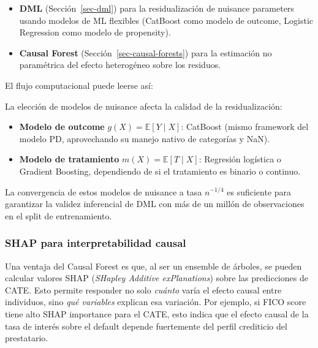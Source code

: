 \documentclass[
  spanish,
  11pt,
  letterpaper,
]{scrbook}
\providecommand{\tightlist}{%
  \setlength{\itemsep}{0pt}\setlength{\parskip}{0pt}}
\theoremstyle{plain}
\theoremstyle{remark}
\begin{document}
\begin{itemize}
\tightlist
\item
  \textbf{DML} (Sección~\ref{sec-dml}) para la residualización de
  nuisance parameters usando modelos de ML flexibles (CatBoost como
  modelo de outcome, Logistic Regression como modelo de propensity).
\item
  \textbf{Causal Forest} (Sección~\ref{sec-causal-forests}) para la
  estimación no paramétrica del efecto heterogéneo sobre los residuos.
\end{itemize}

El flujo computacional puede leerse así:

\begin{tcolorbox}[enhanced jigsaw, arc=.35mm, bottomrule=.15mm, bottomtitle=1mm, breakable, colback=white, colbacktitle=quarto-callout-note-color!10!white, colframe=quarto-callout-note-color-frame, coltitle=black, left=2mm, leftrule=.75mm, opacityback=0, opacitybacktitle=0.6, rightrule=.15mm, title=\textcolor{quarto-callout-note-color}{\faInfo}\hspace{0.5em}{Modelos de nuisance en este proyecto}, titlerule=0mm, toprule=.15mm, toptitle=1mm]

La elección de modelos de nuisance afecta la calidad de la
residualización:

\begin{itemize}
\tightlist
\item
  \textbf{Modelo de outcome} \(g(X) = \mathbb{E}[Y \mid X]\): CatBoost
  (mismo framework del modelo PD, aprovechando su manejo nativo de
  categorías y NaN).
\item
  \textbf{Modelo de tratamiento} \(m(X) = \mathbb{E}[T \mid X]\):
  Regresión logística o Gradient Boosting, dependiendo de si el
  tratamiento es binario o continuo.
\end{itemize}

La convergencia de estos modelos de nuisance a tasa \(n^{-1/4}\) es
suficiente para garantizar la validez inferencial de DML con más de un
millón de observaciones en el split de entrenamiento.

\end{tcolorbox}

\subsubsection{SHAP para interpretabilidad
causal}\label{shap-para-interpretabilidad-causal}

Una ventaja del Causal Forest es que, al ser un ensemble de árboles, se
pueden calcular valores SHAP (\emph{SHapley Additive exPlanations})
sobre las predicciones de CATE. Esto permite responder no solo
\emph{cuánto} varía el efecto causal entre individuos, sino \emph{qué
variables} explican esa variación. Por ejemplo, si FICO score tiene alto
SHAP importance para el CATE, esto indica que el efecto causal de la
tasa de interés sobre el default depende fuertemente del perfil
crediticio del prestatario.
\end{document}
